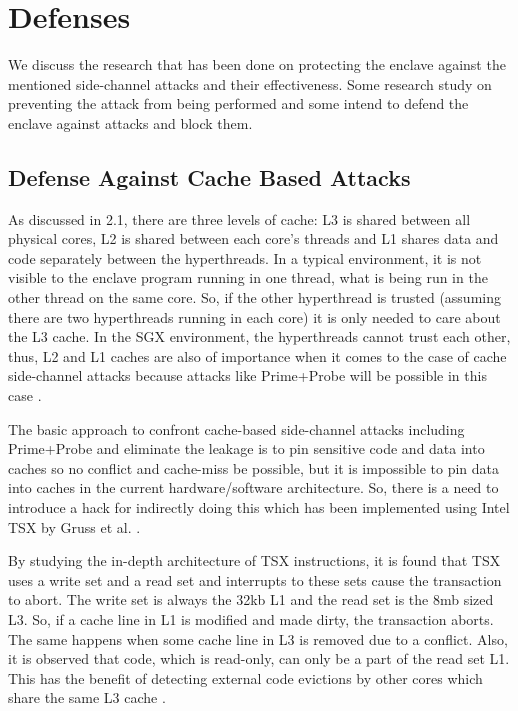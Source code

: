 \section{Defenses}
We discuss the research that has been done on protecting the enclave against the mentioned side-channel attacks and their effectiveness. Some research study on preventing the attack from being performed and some intend to defend the enclave against attacks and block them.

\subsection{Defense Against Cache Based Attacks}
As discussed in 2.1, there are three levels of cache: L3 is shared between all physical cores, L2 is shared between each core's threads and L1 shares data and code separately between the hyperthreads. In a typical environment, it is not visible to the enclave program running in one thread, what is being run in the other thread on the same core. So, if the other hyperthread is trusted (assuming there are two hyperthreads running in each core) it is only needed to care about the L3 cache. In the SGX environment, the hyperthreads cannot trust each other, thus, L2 and L1 caches are also of importance when it comes to the case of cache side-channel attacks because attacks like Prime+Probe will be possible in this case \cite{cloak}.

The basic approach to confront cache-based side-channel attacks including Prime+Probe and eliminate the leakage is to pin sensitive code and data into caches so no conflict and cache-miss be possible, but it is impossible to pin data into caches in the current hardware/software architecture. So, there is a need to introduce a hack for indirectly doing this which has been implemented using Intel TSX by Gruss et al. \cite{cloak}.

By studying the in-depth architecture of TSX instructions, it is found that TSX uses a write set and a read set and interrupts to these sets cause the transaction to abort. The write set is always the 32kb L1 and the read set is the 8mb sized L3. So, if a cache line in L1 is modified and made dirty, the transaction aborts. The same happens when some cache line in L3 is removed due to a conflict. Also, it is observed that code, which is read-only, can only be a part of the read set L1. This has the benefit of detecting external code evictions by other cores which share the same L3 cache \cite{cloak}.

